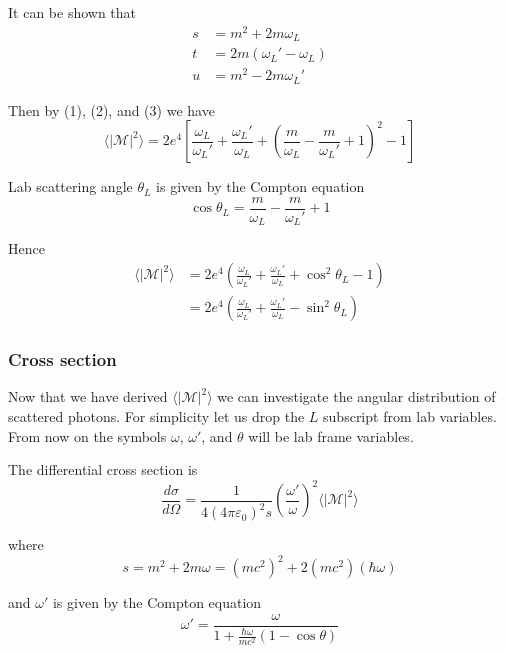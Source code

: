 It can be shown that
\begin{equation*}
\begin{aligned}
s&=m^2+2m\omega_L
\\
t&=2m(\omega_L' - \omega_L)
\\
u&=m^2-2 m \omega_L'
\end{aligned}
\tag{3}
\end{equation*}

Then by (1), (2), and (3) we have
\begin{equation*}
\langle|\mathcal{M}|^2\rangle=2e^4
\left[
\frac{\omega_L}{\omega_L'}+\frac{\omega_L'}{\omega_L}
+\left(\frac{m}{\omega_L}-\frac{m}{\omega_L'}+1\right)^2-1
\right]
\end{equation*}

Lab scattering angle $\theta_L$ is given by the Compton equation
\begin{equation*}
\cos\theta_L=\frac{m}{\omega_L}-\frac{m}{\omega_L'}+1
\end{equation*}

Hence
\begin{align*}
\langle|\mathcal{M}|^2\rangle
&=2e^4\left(
\frac{\omega_L}{\omega_L'}+\frac{\omega_L'}{\omega_L}+\cos^2\theta_L-1
\right)
\\
&=2e^4\left(
\frac{\omega_L}{\omega_L'}+\frac{\omega_L'}{\omega_L}-\sin^2\theta_L
\right)
\end{align*}

\subsubsection*{Cross section}

Now that we have derived $\langle|\mathcal{M}|^2\rangle$
we can investigate the angular distribution of scattered photons.
For simplicity let us drop the $L$ subscript from lab variables.
From now on the symbols $\omega$, $\omega'$, and $\theta$ will be lab frame variables.

\bigskip
The differential cross section is
\begin{equation*}
\frac{d\sigma}{d\Omega}=\frac{1}{4(4\pi\varepsilon_0)^2s}
\left(\frac{\omega'}{\omega}\right)^2\langle|\mathcal{M}|^2\rangle
\end{equation*}

where
\begin{equation*}
s=m^2+2m\omega=(mc^2)^2+2(mc^2)(\hbar\omega)
\end{equation*}

and $\omega'$ is given by the Compton equation
\begin{equation*}
\omega'=\frac{\omega}{1+\frac{\hbar\omega}{mc^2}(1-\cos\theta)}
\end{equation*}

